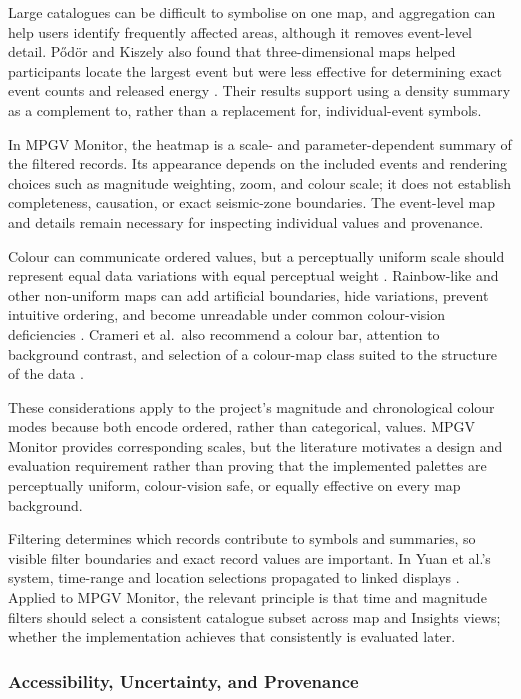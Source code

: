 \documentclass[12pt]{article}
\begin{document}
Large catalogues can be difficult to symbolise on one map, and aggregation can help users identify frequently affected areas, although it removes event-level detail. P{\H{o}}d{\"o}r and Kiszely also found that three-dimensional maps helped participants locate the largest event but were less effective for determining exact event counts and released energy \cite[pp.~156, 160--161]{PodorKiszely2014}. Their results support using a density summary as a complement to, rather than a replacement for, individual-event symbols.

In MPGV Monitor, the heatmap is a scale- and parameter-dependent summary of the filtered records. Its appearance depends on the included events and rendering choices such as magnitude weighting, zoom, and colour scale; it does not establish completeness, causation, or exact seismic-zone boundaries. The event-level map and details remain necessary for inspecting individual values and provenance.

Colour can communicate ordered values, but a perceptually uniform scale should represent equal data variations with equal perceptual weight \cite[p.~4]{Crameri2020}. Rainbow-like and other non-uniform maps can add artificial boundaries, hide variations, prevent intuitive ordering, and become unreadable under common colour-vision deficiencies \cite[p.~2]{Crameri2020}. Crameri et al.\ also recommend a colour bar, attention to background contrast, and selection of a colour-map class suited to the structure of the data \cite[pp.~6--7]{Crameri2020}.

These considerations apply to the project's magnitude and chronological colour modes because both encode ordered, rather than categorical, values. MPGV Monitor provides corresponding scales, but the literature motivates a design and evaluation requirement rather than proving that the implemented palettes are perceptually uniform, colour-vision safe, or equally effective on every map background.

Filtering determines which records contribute to symbols and summaries, so visible filter boundaries and exact record values are important. In Yuan et al.'s system, time-range and location selections propagated to linked displays \cite[p.~1415]{Yuan2010}. Applied to MPGV Monitor, the relevant principle is that time and magnitude filters should select a consistent catalogue subset across map and Insights views; whether the implementation achieves that consistently is evaluated later.

\subsubsection{Accessibility, Uncertainty, and Provenance}
\end{document}
